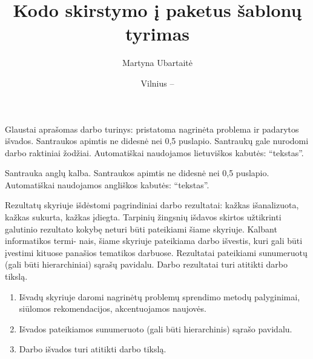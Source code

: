 \documentclass[
]{VUMIFPSbakalaurinis}
\title{Kodo skirstymo į paketus šablonų tyrimas}
\author{Martyna Ubartaitė}
\date{Vilnius – \the\year}
\begin{document}
\maketitle


\begin{lithuanian}
Glaustai aprašomas darbo turinys: pristatoma nagrinėta problema ir padarytos
išvados. Santraukos apimtis ne didesnė nei 0,5 puslapio. Santraukų gale
nurodomi darbo raktiniai žodžiai. Automatiškai naudojamos lietuviškos kabutės: \enquote{tekstas}.

\end{lithuanian}

\begin{english}
Santrauka anglų kalba. Santraukos apimtis ne didesnė nei 0,5 puslapio. Automatiškai naudojamos angliškos kabutės: \enquote{tekstas}.

\end{english}

\tableofcontents








Rezultatų skyriuje išdėstomi pagrindiniai darbo rezultatai: kažkas išanalizuota,
kažkas sukurta, kažkas įdiegta. Tarpinių žingsnių išdavos skirtos užtikrinti galutinio
rezultato kokybę neturi būti pateikiami šiame skyriuje. Kalbant informatikos termi-
nais, šiame skyriuje pateikiama darbo išvestis, kuri gali būti įvestimi kituose panašios
tematikos darbuose. Rezultatai pateikiami sunumeruotų (gali būti hierarchiniai) sąrašų
pavidalu. Darbo rezultatai turi atitikti darbo tikslą.

\begin{enumerate}[labelindent=0pt]
    \item Išvadų skyriuje daromi nagrinėtų problemų sprendimo metodų palyginimai, siūlomos
rekomendacijos, akcentuojamos naujovės.
    \item Išvados pateikiamos sunumeruoto (gali būti hierarchinis) sąrašo pavidalu.
    \item Darbo išvados turi atitikti darbo tikslą.
\end{enumerate}
\end{document}
